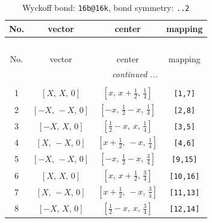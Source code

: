 \documentclass[fleqn,8pt]{jsarticle}
\begin{document}
\begin{longtable}{cccc}
\caption{Wyckoff bond: {\tt 16b@16k}, bond symmetry: {\tt ..2}}
 \\
 \hline \hline
No. & vector & center & mapping \\ \hline \endfirsthead

\multicolumn{3}{l}{\tablename\ \thetable{}} \\
 \hline \hline
No. & vector & center & mapping \\ \hline \endhead

 \hline \hline
\multicolumn{3}{r}{\footnotesize\it continued ...} \\ \endfoot

 \hline \hline
\multicolumn{3}{r}{} \\ \endlastfoot

1 & $\left[ X,\, X,\, 0 \right]$ & $\left[ x,\, x + \frac{1}{2},\, \frac{1}{4} \right]$ & {\tt [1,7]} \\ \hline
2 & $\left[ - X,\, - X,\, 0 \right]$ & $\left[ - x,\, \frac{1}{2} - x,\, \frac{1}{4} \right]$ & {\tt [2,8]} \\ \hline
3 & $\left[ - X,\, X,\, 0 \right]$ & $\left[ \frac{1}{2} - x,\, x,\, \frac{1}{4} \right]$ & {\tt [3,5]} \\ \hline
4 & $\left[ X,\, - X,\, 0 \right]$ & $\left[ x + \frac{1}{2},\, - x,\, \frac{1}{4} \right]$ & {\tt [4,6]} \\ \hline
5 & $\left[ - X,\, - X,\, 0 \right]$ & $\left[ - x,\, \frac{1}{2} - x,\, \frac{3}{4} \right]$ & {\tt [9,15]} \\ \hline
6 & $\left[ X,\, X,\, 0 \right]$ & $\left[ x,\, x + \frac{1}{2},\, \frac{3}{4} \right]$ & {\tt [10,16]} \\ \hline
7 & $\left[ X,\, - X,\, 0 \right]$ & $\left[ x + \frac{1}{2},\, - x,\, \frac{3}{4} \right]$ & {\tt [11,13]} \\ \hline
8 & $\left[ - X,\, X,\, 0 \right]$ & $\left[ \frac{1}{2} - x,\, x,\, \frac{3}{4} \right]$ & {\tt [12,14]} \\
\end{longtable}
\renewcommand{\arraystretch}{1.2}
\end{document}
